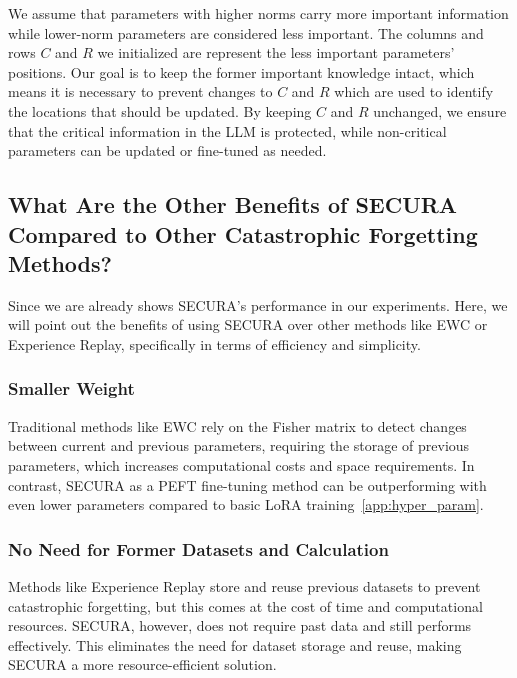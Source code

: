 We assume that parameters with higher norms carry more important information while lower-norm parameters are considered less important. The columns and rows \( C \) and \( R \) we initialized are represent the less important parameters' positions. Our goal is to keep the former important knowledge intact, which means it is necessary to prevent changes to \( C \) and \( R \) which are used to identify the locations that should be updated. By keeping \( C \) and \( R \) unchanged, we ensure that the critical information in the LLM is protected, while non-critical parameters can be updated or fine-tuned as needed.

\subsection{What Are the Other Benefits of SECURA Compared to Other Catastrophic Forgetting Methods?}

Since we are already shows SECURA's performance in our experiments. Here, we will point out the benefits of using SECURA over other methods like EWC or Experience Replay, specifically in terms of efficiency and simplicity.

\subsubsection{Smaller Weight}

Traditional methods like EWC rely on the Fisher matrix to detect changes between current and previous parameters, requiring the storage of previous parameters, which increases computational costs and space requirements. In contrast, SECURA as a PEFT fine-tuning method can be outperforming with even lower parameters compared to basic LoRA training~\ref{app:hyper_param}. 

\subsubsection{No Need for Former Datasets and Calculation}

Methods like Experience Replay store and reuse previous datasets to prevent catastrophic forgetting, but this comes at the cost of time and computational resources. SECURA, however, does not require past data and still performs effectively. This eliminates the need for dataset storage and reuse, making SECURA a more resource-efficient solution.


